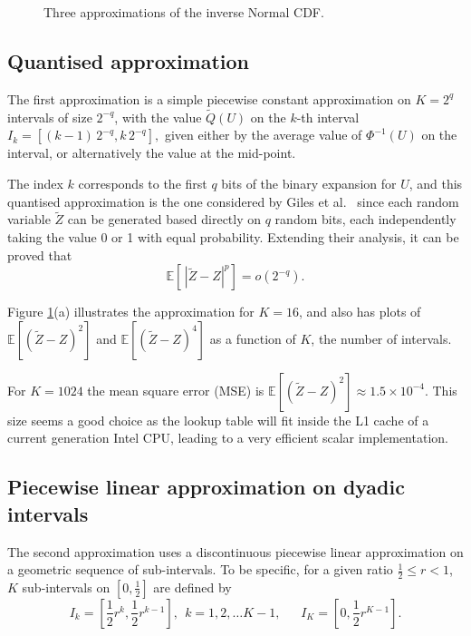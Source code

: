 \documentclass[review]{siamart190516}
\def \EE {{\mathbb{E}}}
\def \tQ {{\widetilde{Q}}}
\def \tZ {{\widetilde{Z}}}
\newcommand{\fracs}[2]{{\textstyle \frac{#1}{#2}}}
\begin{document}
\begin{figure}
\begin{center}
 \\
 \\
\end{center}
\caption{Three approximations of the inverse Normal CDF.}
\label{fig:fig1}
\end{figure}

\subsection{Quantised approximation}

The first approximation is a simple piecewise constant approximation on
$K\!=\!2^q$ intervals of size $2^{-q}$, with the value $\tQ(U)$ on the
$k$-th interval
$\displaystyle
I_k = [(k{-}1)\, 2^{-q}, k\, 2^{-q}],
$
given either by the average value of $\Phi^{-1}(U)$ on the interval, or 
alternatively the value at the mid-point.

The index $k$ corresponds to the first $q$ bits of the binary expansion 
for $U$, and this quantised approximation is the one considered by 
Giles et al.~\cite{ghmr19,ghmr19b}
since each random variable $\tZ$ can be generated based directly on 
$q$ random bits, each independently taking the value 0 or 1 with equal 
probability.  Extending their analysis, it can be proved that
\[
\EE[\, |\tZ{-}Z|^p] = o(2^{-q} ).
\]

Figure \ref{fig:fig1}(a) illustrates the approximation for $K\!=\!16$, 
and also has plots of $\EE[(\tZ{-}Z)^2]$ and $\EE[(\tZ{-}Z)^4]$ 
as a function of $K$, the number of intervals.

For $K\!=\!1024$ the mean square error (MSE) is
$\EE[(\tZ{-}Z)^2] \!\approx\! 1.5\!\times\! 10^{-4}$.
This size seems a good choice as the lookup table will fit inside the L1 
cache of a current generation Intel CPU, leading to a very efficient scalar 
implementation.

\subsection{Piecewise linear approximation on dyadic intervals}

The second approximation uses a discontinuous piecewise linear approximation
on a geometric sequence of sub-intervals.  To be specific, for a given ratio 
$\fracs{1}{2}\leq r < 1$, $K$ sub-intervals on $[0,\fracs{1}{2}]$ are defined by
\[
I_k = [\fracs{1}{2} r^{k},\fracs{1}{2} r^{k-1}], ~~ k = 1, 2, \ldots K{-}1,  ~~~~~~~
I_K = [0, \fracs{1}{2} r^{K-1}].
\]
\end{document}
